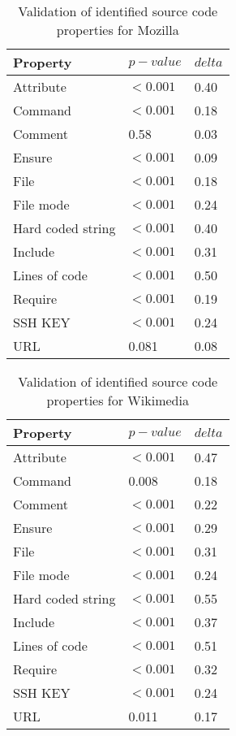 \begin{table}[h]
    \caption{Validation of identified source code properties for Mozilla}
    \label{table:rq1-mozilla}
    \centering
    \begin{tabular}{|l|l|l|}
    \hline
        Property & $p-value$ & $delta$ \\ \hline
        Attribute & $<0.001$ & 0.40 \\ \hline
        Command & $<0.001$ & 0.18 \\ \hline
        Comment & 0.58 & 0.03 \\ \hline
        Ensure & $<0.001$ & 0.09 \\ \hline
        File & $<0.001$ & 0.18 \\ \hline
        File mode & $<0.001$ & 0.24 \\ \hline
        Hard coded string & $<0.001$ & 0.40 \\ \hline
        Include & $<0.001$ & 0.31 \\ \hline
        Lines of code & $<0.001$ & 0.50 \\ \hline
        Require & $<0.001$ & 0.19 \\ \hline
        SSH KEY & $<0.001$ & 0.24 \\ \hline
        URL & 0.081 & 0.08 \\ \hline
    \end{tabular}
\end{table}


\begin{table}[h]
    \caption{Validation of identified source code properties for Wikimedia}
    \label{table:rq1-wikimedia}
    \centering
    \begin{tabular}{|l|l|l|}
    \hline
        Property & $p-value$ & $delta$ \\ \hline
        Attribute & $<0.001$ & 0.47 \\ \hline
        Command & 0.008 & 0.18 \\ \hline
        Comment & $<0.001$ & 0.22 \\ \hline
        Ensure & $<0.001$ & 0.29 \\ \hline
        File & $<0.001$ & 0.31 \\ \hline
        File mode & $<0.001$ & 0.24 \\ \hline
        Hard coded string & $<0.001$ & 0.55 \\ \hline
        Include & $<0.001$ & 0.37 \\ \hline
        Lines of code & $<0.001$ & 0.51 \\ \hline
        Require & $<0.001$ & 0.32 \\ \hline
        SSH KEY & $<0.001$ & 0.24 \\ \hline
        URL & 0.011 & 0.17 \\ \hline
    \end{tabular}
\end{table}

